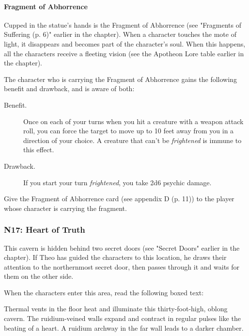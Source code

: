 \documentclass[a4paper, 11pt, bg=full, twocolumn, nooutline]{dndbook}
\begin{document}
\paragraph{Fragment of Abhorrence}

Cupped in the statue's hands is the Fragment of Abhorrence (see "Fragments of Suffering (p. 6)" earlier in the chapter). When a character touches the mote of light, it disappears and becomes part of the character's soul. When this happens, all the characters receive a fleeting vision (see the Apotheon Lore table earlier in the chapter).

The character who is carrying the Fragment of Abhorrence gains the following benefit and drawback, and is aware of both:

\begin{DndSidebar}{}
\begin{description}
\item[Benefit.] Once on each of your turns when you hit a creature with a weapon attack roll, you can force the target to move up to 10 feet away from you in a direction of your choice. A creature that can't be \textit{frightened} is immune to this effect.
\item[Drawback.] If you start your turn \textit{frightened}, you take 2d6 psychic damage.
\end{description}
\end{DndSidebar}

Give the Fragment of Abhorrence card (see appendix D (p. 11)) to the player whose character is carrying the fragment.

\subsubsection{N17: Heart of Truth}

This cavern is hidden behind two secret doors (see "Secret Doors" earlier in the chapter). If Theo has guided the characters to this location, he draws their attention to the northernmost secret door, then passes through it and waits for them on the other side.

When the characters enter this area, read the following boxed text:

\begin{DndReadAloud}
Thermal vents in the floor heat and illuminate this thirty-foot-high, oblong cavern. The ruidium-veined walls expand and contract in regular pulses like the beating of a heart. A ruidium archway in the far wall leads to a darker chamber.
\end{DndReadAloud}
\end{document}
